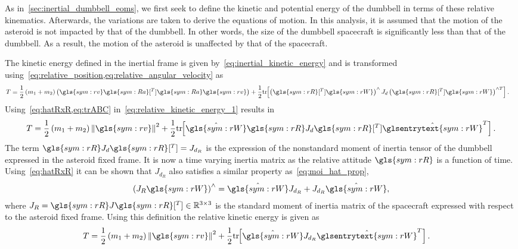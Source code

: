 As in~\cref{sec:inertial_dumbbell_eoms}, we first seek to define the kinetic and potential energy of the dumbbell in terms of these relative kinematics. 
Afterwards, the variations are taken to derive the equations of motion.
In this analysis, it is assumed that the motion of the asteroid is not impacted by that of the dumbbell.
In other words, the size of the dumbbell spacecraft is significantly less than that of the dumbbell. 
As a result, the motion of the asteroid is unaffected by that of the spacecraft.

The kinetic energy defined in the inertial frame is given by~\cref{eq:inertial_kinetic_energy} and is transformed using~\cref{eq:relative_position,eq:relative_angular_velocity} as
\begin{align}\label{eq:relative_kinetic_energy_1}
    T &= \frac{1}{2} \parenth{m_1 + m_2} \parenth{\gls{sym:rv} \gls{sym:Ra}[^T] \gls{sym:Ra} \gls{sym:rv}} + \frac{1}{2} \tr{\parenth{\gls{sym:rR}[^T] \gls{sym:rW}}^\wedge J_d \parenth{\gls{sym:rR}[^T] \gls{sym:rW} }^{\wedge T}}. 
\end{align}
Using~\cref{eq:hatRxR,eq:trABC} in~\cref{eq:relative_kinetic_energy_1} results in
\begin{align}\label{eq:relative_kinetic_energy_2}
    T = \frac{1}{2} \parenth{m_1 + m_2} \norm{\gls{sym:rv}}^2 + \frac{1}{2} \tr{\hat{\gls{sym:rW}} \gls{sym:rR} J_d \gls{sym:rR}[^T] \hat{\glsentrytext{sym:rW}}^T}.
\end{align}
The term \( \gls{sym:rR} J_d \gls{sym:rR}[^T] = J_{d_R}\) is the expression of the nonstandard moment of inertia tensor of the dumbbell expressed in the asteroid fixed frame. 
It is now a time varying inertia matrix as the relative attitude \( \gls{sym:rR} \) is a function of time.
Using~\cref{eq:hatRxR} it can be shown that \( J_{d_R} \) also satisfies a similar property as~\cref{eq:moi_hat_prop}, 
\begin{align}\label{eq:moi_relative_hat_prop}
    \parenth{J_R \gls{sym:rW}}^\wedge = \hat{\gls{sym:rW}} J_{d_R} + J_{d_R}\hat{\gls{sym:rW}},
\end{align}
where \( J_R = \gls{sym:rR} J \gls{sym:rR}[^T] \in \R^{3 \times 3}\) is the standard moment of inertia matrix of the spacecraft expressed with respect to the asteroid fixed frame.
Using this definition the relative kinetic energy is given as
\begin{align}\label{eq:relative_kinetic_energy}
    T &= \frac{1}{2} \parenth{m_1 + m_2} \norm{\gls{sym:rv}}^2 + \frac{1}{2} \tr{\hat{\gls{sym:rW}} J_{d_R} \hat{\glsentrytext{sym:rW}}^T}.
\end{align}

